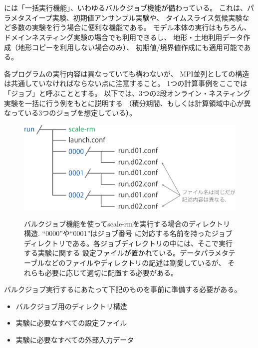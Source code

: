 \section{\SecAdvanceBulkjob} \label{sec:bulkjob}

\scalerm には「一括実行機能」、いわゆるバルクジョブ機能が備わっている。
これは、パラメタスイープ実験、初期値アンサンブル実験や、
タイムスライス気候実験など多数の実験を行う場合に便利な機能である。
\scalerm モデル本体の実行はもちろん、ドメインネスティング実験の場合でも利用できるし、
地形・土地利用データ作成（地形コピーを利用しない場合のみ）、
初期値/境界値作成にも適用可能である。

各プログラムの実行内容は異なっていても構わないが、
MPI並列としての構造は共通していなければならない点に注意すること。
1つの計算事例をここでは「ジョブ」と呼ぶこととする。
以下では、3つの2段オンライン・ネスティング実験を一括に行う例をもとに説明する
（積分期間、もしくは計算領域中心が異なっている3つのジョブを想定している）。


\begin{figure}[t]
\begin{center}
  \includegraphics[width=0.6\hsize]{./figure/bulkjob_directory_structure.eps}\\
  \caption{バルクジョブ機能を使ってscale-rmを実行する場合のディレクトリ構造. ``0000''や``0001''はジョブ番号
           に対応する名前を持ったジョブディレクトリである。各ジョブディレクトリの中には、そこで実行する実験に関する
           設定ファイルが置かれている。データパラメタテーブルなどのファイルやディレクトリの記述は割愛しているが、
           それらも必要に応じて適切に配置する必要がある。}
  \label{fig_bulkjob}
\end{center}
\end{figure}



バルクジョブ実行するにあたって下記のものを事前に準備する必要がある。
\begin{itemize}
\item バルクジョブ用のディレクトリ構造
\item 実験に必要なすべての設定ファイル
\item 実験に必要なすべての外部入力データ
\end{itemize}

